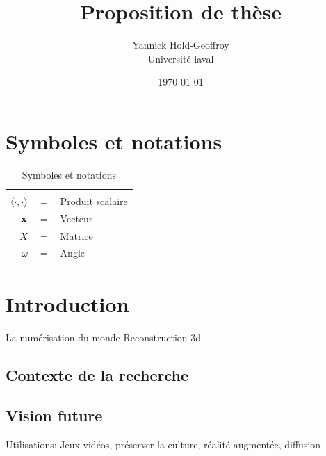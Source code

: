 \documentclass{report}
\title{Proposition de th\`ese}
\author{Yannick Hold-Geoffroy  \\
    Universit\'e laval  \\
    }
\date{\today}
\begin{document}
 

\maketitle

\newcommand{\boldomega}{\boldsymbol \omega} %
\newcommand{\boldmu}{\boldsymbol \mu} %
\newcommand{\bolddelta}{\boldsymbol \delta} %

\graphicspath{{figures/}}



\chapter*{Symboles et notations}

\begin{table}[htbp]\caption{Symboles et notations}
\centering %
\begin{tabular}{r c p{10cm} }

\hline & & \\
$\langle \cdot, \cdot \rangle$      & $=$ & Produit scalaire \\
$\bold{x}$                          & $=$ & Vecteur \\
$X$                                 & $=$ & Matrice \\
$\omega$                            & $=$ & Angle \\
\hline
\end{tabular}
\label{tab:TableOfNotationForMyResearch}
\end{table}


\chapter{Introduction}

La numérisation du monde
Reconstruction 3d

\section{Contexte de la recherche}


\section{Vision future}

Utilisations: Jeux vidéos, préserver la culture, réalité augmentée, diffusion
\end{document}
